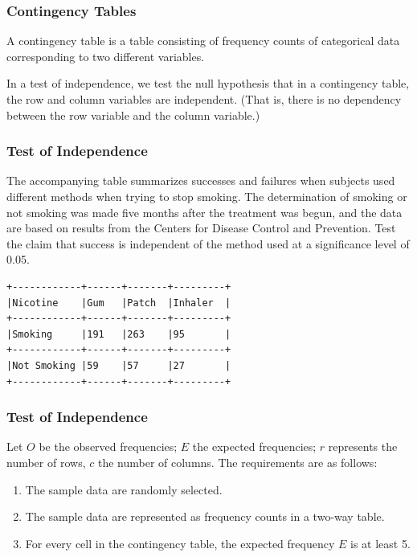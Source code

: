 \documentclass[xcolor=dvipsnames]{beamer}
\begin{document}
\begin{frame}
  \frametitle{Contingency Tables}
  A \alert{contingency table} is a table consisting of frequency
  counts of categorical data corresponding to two different
  variables.

  \bigskip

  In a \alert{test of independence}, we test the null hypothesis
  that in a contingency table, the row and column variables are
  independent. (That is, there is no dependency between the row
  variable and the column variable.)
\end{frame}

\begin{frame}[fragile]
  \frametitle{Test of Independence}
   The accompanying table summarizes
  successes and failures when subjects used different methods
  when trying to stop smoking. The determination of smoking or not
  smoking was made five months after the treatment was begun, and
  the data are based on results from the Centers for Disease
  Control and Prevention. Test the claim that success is
  independent of the method used at a significance level of 0.05.
\begin{verbatim}
+------------+------+-------+---------+
|Nicotine    |Gum   |Patch  |Inhaler  |
+------------+------+-------+---------+
|Smoking     |191   |263    |95       |
+------------+------+-------+---------+
|Not Smoking |59    |57     |27       |
+------------+------+-------+---------+
\end{verbatim}
\end{frame}

\begin{frame}
  \frametitle{Test of Independence}
  Let $O$ be the observed frequencies; $E$ the expected
  frequencies; $r$ represents the number of rows, $c$ the number
  of columns. The requirements are as follows:
  \begin{enumerate}
  \item The sample data are randomly selected.
  \item The sample data are represented as frequency counts in a
    two-way table.
  \item For every cell in the contingency table, the expected
    frequency $E$ is at least 5.
  \end{enumerate}
\end{frame}
\end{document}
